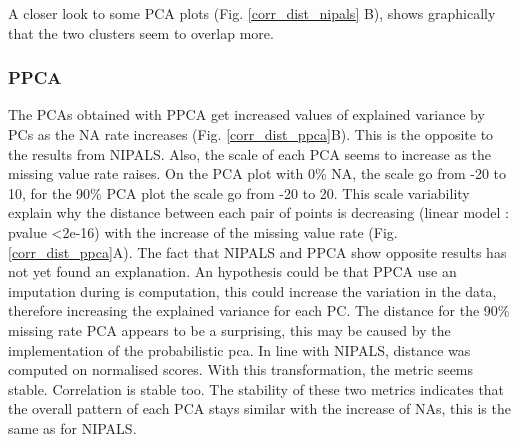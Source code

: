 \documentclass[a4paper, 11pt, twocolumn]{article}
\begin{document}
A closer look to some PCA plots (Fig. \ref{corr_dist_nipals} B), shows graphically that the two clusters seem to overlap more.



\subsubsection*{PPCA}

The PCAs obtained with PPCA get increased values of explained variance by PCs as the NA rate increases (Fig. \ref{corr_dist_ppca}B). This is the opposite to the results from NIPALS. Also, the scale of each PCA seems to increase as the missing value rate raises. On the PCA plot with 0\% NA, the scale go from -20 to 10,  for the 90\% PCA plot the scale go from -20 to 20. This scale variability explain why the distance between each pair of points is decreasing (linear model : pvalue <2e-16) with the increase of the missing value rate (Fig. \ref{corr_dist_ppca}A). The fact that NIPALS and PPCA show opposite results has not yet found an explanation. An hypothesis could be that PPCA use an imputation during is computation, this could increase the variation in the data, therefore increasing the explained variance for each PC. The distance for the 90\% missing rate PCA appears to be a surprising, this may be caused by the implementation of the probabilistic pca. In line with NIPALS, distance was computed on normalised scores. With this transformation, the metric seems stable. Correlation is stable too. The stability of these two metrics indicates that the overall pattern of each PCA stays similar with the increase of NAs, this is the same as for NIPALS. 
\end{document}
